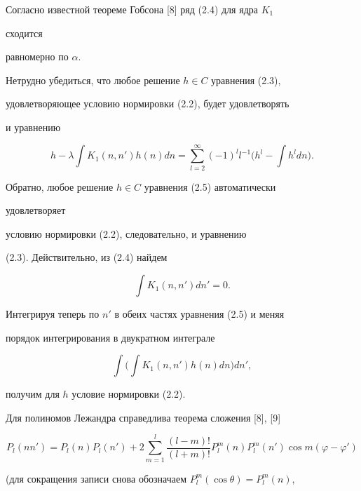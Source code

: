 Согласно известной теореме Гобсона [8] ряд (2.4) для ядра $K_1$ 


сходится 


равномерно по $\alpha$. 


 


Нетрудно убедиться, что любое решение $h\in C$ уравнения (2.3), 


удовлетворяющее условию нормировки (2.2), будет удовлетворять  


и уравнению 


\begin{equation} 


h-\lambda\int K_1(n,n')h(n)dn=\sum^\infty_{l=2} 


(-1)^l l^{-1}\Big(h^l-\int h^ldn\Big).\tag{2.5} 


\end{equation} 


Обратно, любое решение $h\in C$ уравнения (2.5) автоматически 


удовлетворяет 


условию нормировки (2.2), следовательно, и уравнению 


(2.3). Действительно, из (2.4) найдем 


$$ 


\int K_1(n,n')dn'=0. 


$$ 


Интегрируя теперь по $n'$ в обеих частях уравнения (2.5) и меняя 


порядок интегрирования в двукратном интеграле 


$$ 


\int\bigg(\int K_1(n,n')h(n)dn\bigg)dn', 


$$ 


получим для $h$ условие нормировки (2.2). 


 


Для полиномов Лежандра справедлива теорема сложения [8], [9] 


\begin{equation} 


P_l(nn')=P_l(n)P_l(n')+2\sum^l_{m=1} 


\frac{(l-m)!}{(l+m)!}P^m_l(n)P^m_l(n') 


\cos m(\varphi-\varphi')\tag{2.6} 


\end{equation} 


(для сокращения записи снова обозначаем $P^m_l(\cos\theta)=P^m_l(n)$, 


